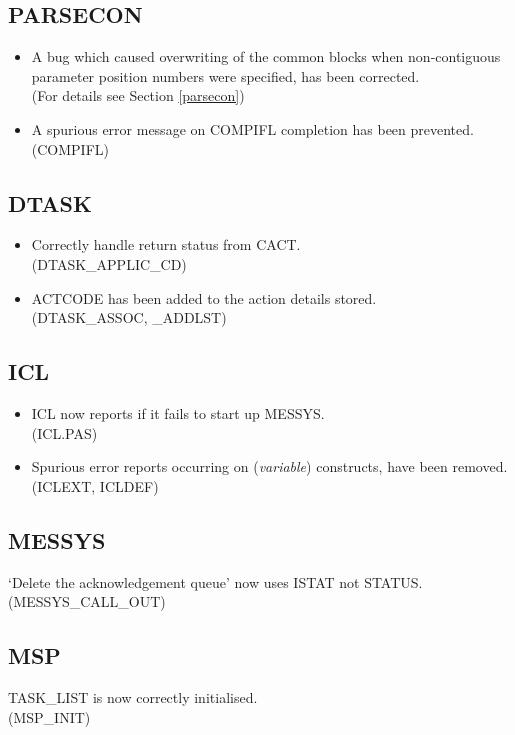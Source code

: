 \subsection{PARSECON}
\begin{itemize}
\item A bug which caused overwriting of the common blocks when non-contiguous
parameter position numbers were specified, has been corrected.\\
(For details see Section \ref{parsecon})
\item A spurious error message on COMPIFL completion has been prevented.\\
(COMPIFL)
\end{itemize}

\subsection{DTASK}
\begin{itemize}
\item Correctly handle return status from CACT.\\
(DTASK\_APPLIC\_CD)
\item ACTCODE has been added to the action details stored.\\
(DTASK\_ASSOC, \_ADDLST)
\end{itemize}

\subsection{ICL}
\begin{itemize}
\item ICL now reports if it fails to start up MESSYS.\\
(ICL.PAS)
\item Spurious error reports occurring on ({\em variable}\/) constructs, have 
been removed.\\
(ICLEXT, ICLDEF)
\end{itemize}

\subsection{MESSYS}
`Delete the acknowledgement queue' now uses ISTAT not STATUS.\\
(MESSYS\_CALL\_OUT)

\subsection{MSP}
TASK\_LIST is now correctly initialised.\\
(MSP\_INIT)

